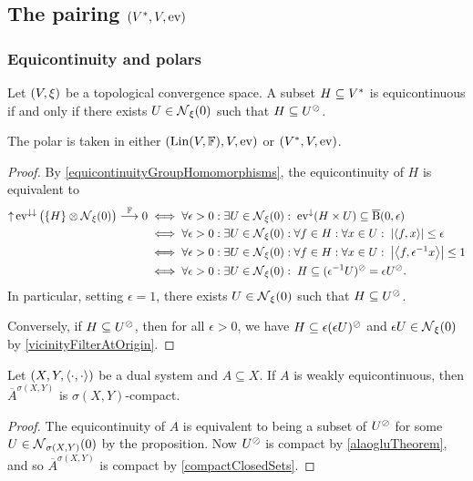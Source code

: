 \subsection{The pairing $\sSet{V^*, V, \evalMap}$}
\subsubsection{Equicontinuity and polars}
\begin{proposition} \label{equicontinuityTopologicalFunctionals}
Let $\sSet{V, \xi}$ be a topological convergence space. A subset $H\subseteq {V}^*$ is equicontinuous \textup{if and only if} there exists $U\in \operatorname{\mathcal{N}}_\xi(0)$ such that $H\subseteq U^\oslash$.
\end{proposition}
The polar is taken in either $\sSet{\Lin(V,\F), V,\evalMap}$ or
$\sSet{\dual{V}, V,\evalMap}$.
\begin{proof}
By \ref{equicontinuityGroupHomomorphisms}, the equicontinuity of $H$ is equivalent to
\begin{align*}
\operatorname{\uparrow}\operatorname{ev}^{\downarrow\downarrow}\big(\{H\}\otimes \operatorname{\mathcal{N}}_\xi(0)\big) \overset{\mathbb{F}}{\longrightarrow} 0 &\iff \forall \epsilon >0: \exists U\in \operatorname{\mathcal{N}}_\xi(0): \; \operatorname{ev}^\downarrow(H\times U) \subseteq \operatorname{\overline{B}}(0,\epsilon) \\
&\iff \forall \epsilon >0: \exists U\in \operatorname{\mathcal{N}}_\xi(0): \forall f\in H: \forall x\in U: \; \left|\left\langle f,x \right\rangle\right|\leq \epsilon \\
&\iff \forall \epsilon >0: \exists U\in \operatorname{\mathcal{N}}_\xi(0): \forall f\in H: \forall x\in U: \; \left|\left\langle f,\epsilon^{-1}x \right\rangle\right|\leq 1 \\
&\iff \forall \epsilon >0: \exists U\in \operatorname{\mathcal{N}}_\xi(0): \;H\subseteq (\epsilon^{-1}U)^\oslash = \epsilon U^\oslash.
\end{align*}
In particular, setting $\epsilon =1$, there exists $U\in \operatorname{\mathcal{N}}_\xi(0)$ such that $H\subseteq U^\oslash$. 

Conversely, if $H\subseteq U^\oslash$, then for all $\epsilon > 0$, we have $H \subseteq \epsilon (\epsilon U)^\oslash$ and $\epsilon U\in \operatorname{\mathcal{N}}_\xi(0)$ by \ref{vicinityFilterAtOrigin}.
\end{proof}
\begin{corollary}
Let $(X,Y,\left\langle \cdot,\cdot \right\rangle)$ be a dual system and $A\subseteq X$. If $A$ is weakly equicontinuous, then $\overline{A}^{\sigma(X,Y)}$ is $\sigma(X,Y)$-compact.
\end{corollary}
\begin{proof}
The equicontinuity of $A$ is equivalent to being a subset of $U^\oslash$ for some $U\in \operatorname{\mathcal{N}}_{\sigma(X,Y)}(0)$ by the proposition. Now $U^\oslash$ is compact by \ref{alaogluTheorem}, and so $\overline{A}^{\sigma(X,Y)}$ is compact by \ref{compactClosedSets}.
\end{proof}

